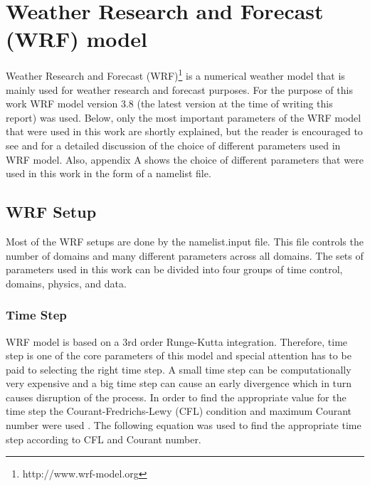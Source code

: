 \documentclass[a4paper,12pt]{article}
\numberwithin{equation}{section} %
\begin{document}
\section{Weather Research and Forecast (WRF) model}

Weather Research and Forecast (WRF)\footnote{http://www.wrf-model.org} is a numerical weather model that is mainly used for weather research and forecast purposes.
For the purpose of this work WRF model version 3.8 (the latest version at the time of writing this report) was used. Below, only the most important parameters of the WRF model that were used in this work are shortly explained, but the reader is encouraged to see \citep{Torgeir} and \citep{wrf3} for a detailed discussion of the choice of different parameters used in WRF model. Also, appendix A shows the choice of different parameters that were used in this work in the form of a namelist file. 



\subsection{WRF Setup}

Most of the WRF setups are done by the namelist.input file. This file controls the number of domains and many different parameters across all domains. The sets of parameters used in this work can be divided into four groups of time control, domains, physics, and data.

\subsubsection{Time Step}

WRF model is based on a 3rd order Runge-Kutta integration. Therefore, time step is one of the core parameters of this model and special attention has to be paid to selecting the right time step. A small time step can be computationally very expensive and a big time step can cause an early divergence which in turn causes disruption of the process. In order to find the appropriate value for the time step the Courant-Fredrichs-Lewy (CFL) condition and maximum Courant number were used \citep{sham,courant}. The following equation was used to find the appropriate time step according to CFL and Courant number.
\end{document}

